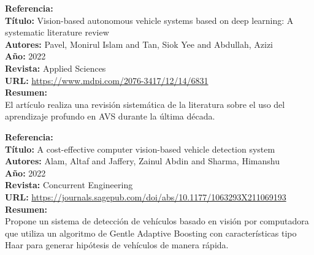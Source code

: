 \documentclass[10pt,letterpaper,final]{article}
\begin{document}
\begin{longtable}
        \newline
        \hline
        \noindent \textbf{Referencia:}~\cite{pavel2022vision}                                          \\
        \textbf{Título:}
        Vision-based autonomous vehicle systems based on deep learning: A systematic literature review \\
        \textbf{Autores:}
        Pavel, Monirul Islam and Tan, Siok Yee and Abdullah, Azizi                                     \\
        \textbf{Año:}
        2022                                                                                           \\
        \textbf{Revista:}
        Applied Sciences                                                                               \\
        \textbf{URL:}
        \url{https://www.mdpi.com/2076-3417/12/14/6831}                                                \\
        \textbf{Resumen:}                                                                              \\
        El artículo realiza una revisión sistemática de la literatura sobre el uso del aprendizaje profundo en AVS durante la última década.
        
        \clearpage
        
        \newline
        \hline
        \noindent \textbf{Referencia:}~\cite{alam2022cost}                                             \\
        \textbf{Título:}
        A cost-effective computer vision-based vehicle detection system                                \\
        \textbf{Autores:}
        Alam, Altaf and Jaffery, Zainul Abdin and Sharma, Himanshu                                     \\
        \textbf{Año:}
        2022                                                                                           \\
        \textbf{Revista:}
        Concurrent Engineering                                                                         \\
        \textbf{URL:}
        \url{https://journals.sagepub.com/doi/abs/10.1177/1063293X211069193}                           \\
        \textbf{Resumen:}                                                                              \\
        Propone un sistema de detección de vehículos basado en visión por computadora que utiliza un algoritmo
        de Gentle Adaptive Boosting con características tipo Haar para generar hipótesis de vehículos de manera rápida.
        
    \end{longtable}
    \clearpage
    
\end{document}
